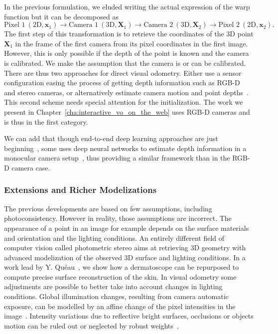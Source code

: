 In the previous formulation, we eluded writing the actual expression of the warp function
but it can be decomposed as
\[
	\text{Pixel 1}\ (\text{2D}, \bm{x}_1)
		\longrightarrow
			\text{Camera 1}\ (\text{3D}, \bm{X}_1)
		\longrightarrow
			\text{Camera 2}\ (\text{3D}, \bm{X}_2)
		\longrightarrow
			\text{Pixel 2}\ (\text{2D}, \bm{x}_2).
\]
The first step of this transformation is to retrieve the coordinates
of the 3D point $\bm{X}_1$ in the frame of the first camera
from its pixel coordinates in the first image.
However, this is only possible if the depth of the point is known
and the camera is calibrated.
We make the assumption that the camera is or can be calibrated.
There are thus two approaches for direct visual odometry.
Either use a sensor configuration easing the process of getting depth information
such as RGB-D~\cite{kerl2013robust} and stereo cameras,
or alternatively estimate camera motion and point depths~\cite{engel2017direct}.
This second scheme needs special attention for the initialization.
The work we present in Chapter~\ref{cha:interactive_vo_on_the_web}
uses RGB-D cameras and is thus in the first category.

We can add that though end-to-end deep learning approaches
are just beginning~\cite{wang2017deepvo},
some uses deep neural networks to estimate depth information
in a monocular camera setup~\cite{yang2018deep},
thus providing a similar framework than in the RGB-D camera case.

\subsubsection{Extensions and Richer Modelizations}%
\label{ssub:vo_extensions}

The previous developments are based on few assumptions,
including photoconsistency.
However in reality, those assumptions are incorrect.
The appearance of a point in an image for example depends on the surface
materials and orientation and the lighting conditions.
An entirely different field of computer vision called photometric stereo
aims at retrieving 3D geometry with advanced modelization of the observed 3D surface
and lighting conditions.
In a work lead by Y. Quéau~\cite{queau2017microgeometry},
we show how a dermatoscope can be repurposed to compute precise surface reconstruction
of the skin.
In visual odometry some adjustments are possible to better take into account
changes in lighting conditions.
Global illumination changes, resulting from camera automatic exposure,
can be modelled by an affine change of the pixel intensities in the image~\cite{engel2017direct}.
Intensity variations due to reflective bright surfaces, occlusions or objects motion
can be ruled out or neglected by robust weights~\cite{klose2013efficient}.

